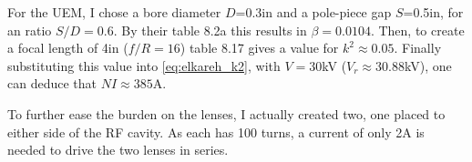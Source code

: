 For the UEM, I chose a bore diameter $D$=0.3in and a pole-piece gap $S$=0.5in, for an ratio $S/D=0.6$.
By their table 8.2a this results in $\beta=0.0104$. Then, to create a focal length of 4in ($f/R=16$) table 8.17 gives a value for $k^2 \approx 0.05$.
Finally substituting this value into \ref{eq:elkareh_k2}, with $V=30$kV ($V_r\approx30.88$kV), one can deduce that $NI\approx385$A.

To further ease the burden on the lenses, I actually created two, one placed to either side of the RF cavity. As each has 100 turns, a current of only 2A is needed to drive the two lenses in series.


